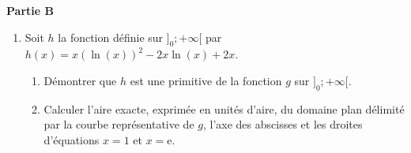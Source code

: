 \documentclass[12pt,a4paper]{article}
\newcommand{\partie}[1]{\vspace{0.45cm}\noindent\textbf{\large Partie #1}\par\vspace{0.25cm}}
\begin{document}
\partie{B}

\begin{enumerate}
    \item Soit $h$ la fonction définie sur $]_0; +\infty[$ par $h(x) = x(\ln(x))^2 - 2x\ln(x) + 2x$.
    \begin{enumerate}
        \item Démontrer que $h$ est une primitive de la fonction $g$ sur $]_0; +\infty[$.
        \item Calculer l'aire exacte, exprimée en unités d'aire, du domaine plan délimité par la courbe représentative de $g$, l'axe des abscisses et les droites d'équations $x = 1$ et $x = \mathrm{e}$.
    \end{enumerate}
\end{enumerate}
\end{document}
